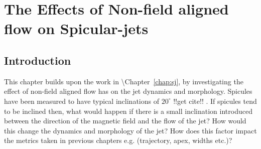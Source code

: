 \documentclass[12pt]{ociamthesis}
\begin{document}
\baselineskip=18pt

\setcounter{secnumdepth}{3}
\setcounter{tocdepth}{3}

\setcounter{chapter}{2}


\chapter{The Effects of Non-field aligned flow on Spicular-jets}
\section{Introduction}
\label{sec:c3intro}
This chapter builds upon the work in \cite{?}\textbackslash Chapter~\ref{chap:sj}, by investigating the effect of non-field aligned flow has on the jet dynamics and morphology. Spicules have been measured to have typical inclinations of $20^{\circ}$ !!get cite!! \citep{Abramowitz1965}. If spicules tend to be inclined then, what would happen if there is a small inclination introduced between the direction of the magnetic field and the flow of the jet? How would this change the dynamics and morphology of the jet? How does this factor impact the metrics taken in previous chapters e.g. (trajectory, apex, widths etc.)?
\end{document}
